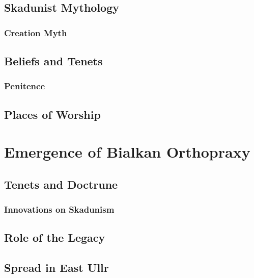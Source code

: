 \subsection{Skadunist Mythology}

\subsubsection{Creation Myth}

\subsection{Beliefs and Tenets}

\subsubsection{Penitence}

\subsection{Places of Worship}

\section{Emergence of Bialkan Orthopraxy}

\subsection{Tenets and Doctrune}

\subsubsection{Innovations on Skadunism}

\subsection{Role of the Legacy}

\subsection{Spread in East Ullr}

